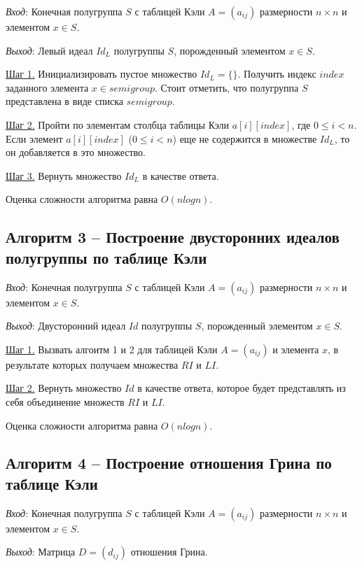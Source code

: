 \documentclass[spec, och, labwork]{shiza}
\begin{document}
      \textit{Вход}: Конечная полугруппа $S$ с таблицей Кэли $A = (a_{ij})$ размерности $n \times n$ и элементом $x \in S$.
  
      \textit{Выход}: Левый идеал $Id_L$ полугруппы $S$, порожденный элементом $x \in S$.
      
      \underline{Шаг 1.} Инициализировать пустое множество $Id_L = \{\}$. Получить индекс $index$ заданного элемента $x \in semigroup$.
      Стоит отметить, что полугруппа $S$ представлена в виде списка $semigroup$.
      
      \underline{Шаг 2.} Пройти по элементам столбца таблицы Кэли $a[i][index]$, где $0 \leq i < n$. Если элемент $a[i][index]$ ($0 \leq i < n$)
      еще не содержится в множестве $Id_L$, то он добавляется в это множество.
      
      \underline{Шаг 3.} Вернуть множество $Id_L$ в качестве ответа.
      
        Оценка сложности алгоритма равна $O(nlog n)$.
  
        \subsection{Алгоритм 3 -- Построение двусторонних идеалов полугруппы по таблице Кэли}
  
      \textit{Вход}: Конечная полугруппа $S$ с таблицей Кэли $A = (a_{ij})$ размерности $n \times n$ и элементом $x \in S$.
  
      \textit{Выход}: Двусторонний идеал $Id$ полугруппы $S$, порожденный элементом $x \in S$.
      
      \underline{Шаг 1.} Вызвать алгоитм 1 и 2 для таблицей Кэли $A = (a_{ij})$ и элемента $x$, в результате которых получаем
      множества $RI$ и $LI$.
      
      \underline{Шаг 2.} Вернуть множество $Id$ в качестве ответа, которое будет представлять из себя объединение множеств $RI$ и $LI$.
      
        Оценка сложности алгоритма равна $O(nlog n)$.
  
  
      \subsection{Алгоритм 4 -- Построение отношения Грина по таблице Кэли}
  
      \textit{Вход}: Конечная полугруппа $S$ с таблицей Кэли $A = (a_{ij})$ размерности $n \times n$ и элементом $x \in S$.
  
      \textit{Выход}: Матрица $D = (d_{ij})$ отношения Грина.
      
\end{document}

